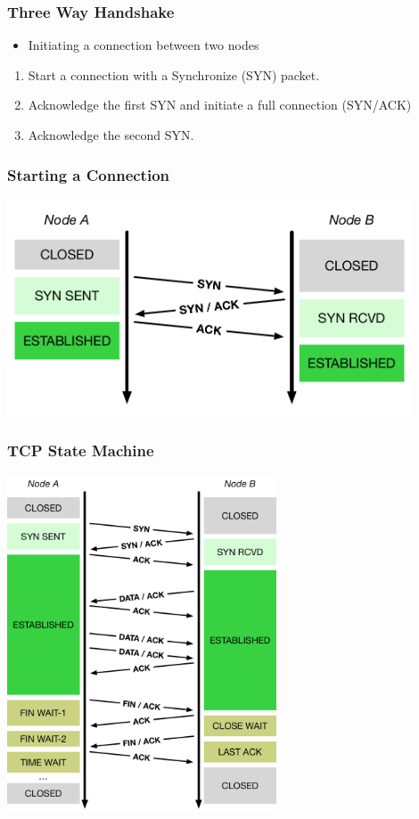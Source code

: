 \documentclass[pdftex]{beamer} %
\begin{document}
\begin{frame}
  \frametitle{Three Way Handshake}
  \begin{itemize}
  \item Initiating a connection between two nodes
  \end{itemize}
  \begin{enumerate}
  \item Start a connection with a Synchronize (SYN) packet.
  \item Acknowledge the first SYN and initiate a full connection (SYN/ACK)
  \item Acknowledge the second SYN.
  \end{enumerate}
\end{frame}

\begin{frame}[fragile]
  \frametitle{Starting a Connection}
  \begin{itemize}
\centering
\includegraphics[width=0.9\textwidth]{../../figures/tcp-three-way.pdf}
  \end{itemize}
\end{frame}

\begin{frame}[fragile]
  \frametitle{TCP State Machine}
  \begin{itemize}
\centering
\includegraphics[width=0.6\textwidth]{../../figures/tcp-timeline.pdf}
  \end{itemize}
\end{frame}
\end{document}
